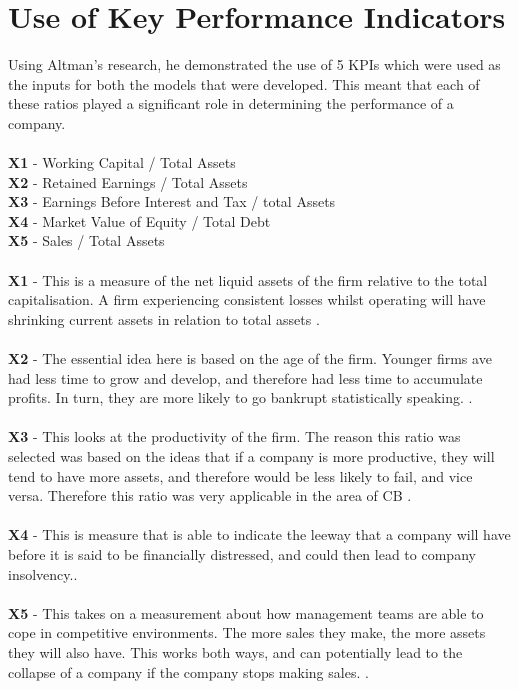 \documentclass[11pt]{article}
\begin{document}
\cleardoublepage


\cleardoublepage

\appendix
\section{Use of Key Performance Indicators}
Using Altman's research, he demonstrated the use of 5 KPIs which were used as the inputs for both the models that were developed. This meant that each of these ratios played a significant role in determining the performance of a company. \\
\\
\textbf{X1} - Working Capital / Total Assets \\
\textbf{X2} - Retained Earnings / Total Assets\\
\textbf{X3} - Earnings Before Interest and Tax / total Assets\\
\textbf{X4} - Market Value of Equity / Total Debt\\
\textbf{X5} - Sales / Total Assets\\
\\
\textbf{X1} - This is a measure of the net liquid assets of the firm relative to the total capitalisation. A firm experiencing consistent losses whilst operating will have shrinking current assets in relation to total assets \cite{ref-six}. \\
\\
\textbf{X2} - The essential idea here is based on the age of the firm. Younger firms ave had less time to grow and develop, and therefore had less time to accumulate profits. In turn, they are more likely to go bankrupt statistically speaking. \cite{ref-six}.\\
\\
\textbf{X3} - This looks at the productivity of the firm. The reason this ratio was selected was based on the ideas that if a company is more productive, they will tend to have more assets, and therefore would be less likely to fail, and vice versa. Therefore this ratio was very applicable in the area of CB \cite{ref-six}.\\
\\
\textbf{X4} - This is measure that is able to indicate the leeway that a company will have before it is said to be financially distressed, and could then lead to company insolvency.\cite{ref-six}.\\
\\
\textbf{X5} - This takes on a measurement about how management teams are able to cope in competitive environments. The more sales they make, the more assets they will also have. This works both ways, and can potentially lead to the collapse of a company if the company stops making sales.  \cite{ref-six}.
\end{document}
